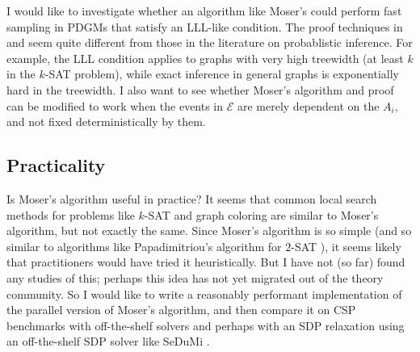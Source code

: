 \documentclass{article}
\begin{document}
I would like to investigate whether an algorithm like Moser's could perform fast sampling in PDGMs that satisfy an LLL-like condition.  The proof techniques in \cite{moser2010constructive} and \cite{haeupler2011new} seem quite different from those in the literature on probablistic inference.  For example, the LLL condition applies to graphs with very high treewidth (at least $k$ in the $k$-SAT problem), while exact inference in general graphs is exponentially hard in the treewidth\cite{wainwright2008graphical}.  I also want to see whether Moser's algorithm and proof can be modified to work when the events in $\mathcal{E}$ are merely dependent on the $A_i$, and not fixed deterministically by them.

\subsection{Practicality}
Is Moser's algorithm useful in practice?  It seems that common local search methods for problems like $k$-SAT and graph coloring are similar to Moser's algorithm, but not exactly the same.  Since Moser's algorithm is so simple (and so similar to algorithms like Papadimitriou's algorithm for $2$-SAT \cite{papadimitriou1991selecting}), it seems likely that practitioners would have tried it heuristically.  But I have not (so far) found any studies of this; perhaps this idea has not yet migrated out of the theory community.  So I would like to write a reasonably performant implementation of the parallel version of Moser's algorithm, and then compare it on CSP benchmarks with off-the-shelf solvers and perhaps with an SDP relaxation \cite{steurer2010fast} using an off-the-shelf SDP solver like SeDuMi \cite{polik2007sedumi}.



\end{document}
